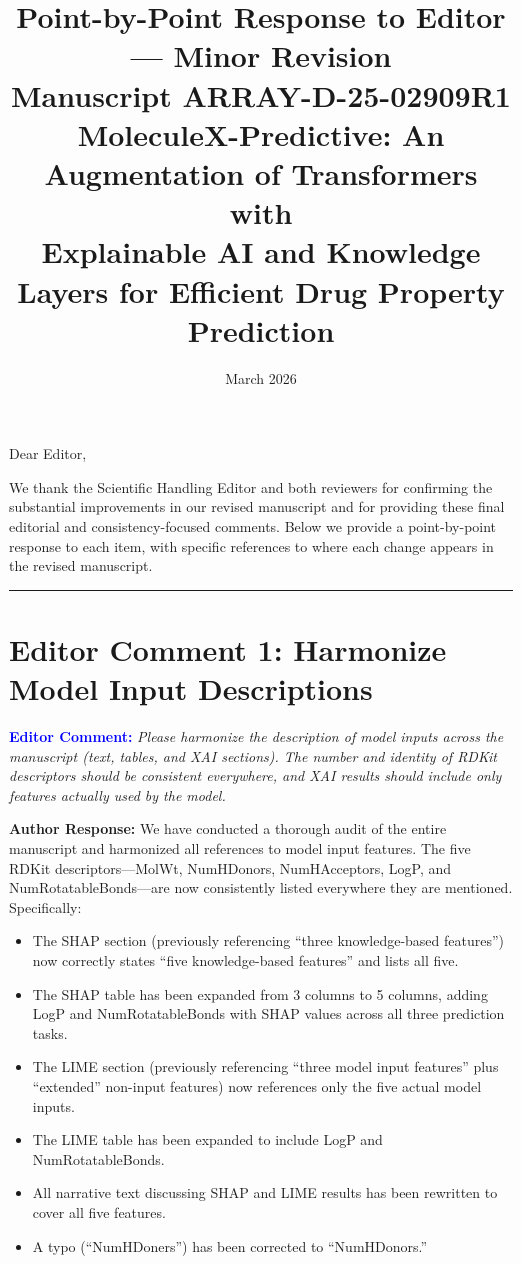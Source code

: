 \documentclass[12pt]{article}
\title{Point-by-Point Response to Editor --- Minor Revision\\[0.5em]
\large Manuscript ARRAY-D-25-02909R1\\
MoleculeX-Predictive: An Augmentation of Transformers with\\Explainable AI and Knowledge Layers for Efficient Drug Property Prediction}
\author{}
\date{March 2026}
\newcommand{\EC}[1]{\textbf{\textcolor{blue}{Editor Comment:}} \textit{#1}\vspace{0.3em}}
\newcommand{\AR}[1]{\textbf{Author Response:} #1\vspace{0.8em}}
\begin{document}
\maketitle

\noindent Dear Editor,

\medskip\noindent We thank the Scientific Handling Editor and both reviewers for confirming the substantial improvements in our revised manuscript and for providing these final editorial and consistency-focused comments. Below we provide a point-by-point response to each item, with specific references to where each change appears in the revised manuscript.

\bigskip
\hrule
\bigskip

\section*{Editor Comment 1: Harmonize Model Input Descriptions}

\EC{Please harmonize the description of model inputs across the manuscript (text, tables, and XAI sections). The number and identity of RDKit descriptors should be consistent everywhere, and XAI results should include only features actually used by the model.}

\AR{We have conducted a thorough audit of the entire manuscript and harmonized all references to model input features. The five RDKit descriptors---MolWt, NumHDonors, NumHAcceptors, LogP, and NumRotatableBonds---are now consistently listed everywhere they are mentioned. Specifically:
\begin{itemize}[nosep]
\item The SHAP section (previously referencing ``three knowledge-based features'') now correctly states ``five knowledge-based features'' and lists all five.
\item The SHAP table has been expanded from 3 columns to 5 columns, adding LogP and NumRotatableBonds with SHAP values across all three prediction tasks.
\item The LIME section (previously referencing ``three model input features'' plus ``extended'' non-input features) now references only the five actual model inputs.
\item The LIME table has been expanded to include LogP and NumRotatableBonds.
\item All narrative text discussing SHAP and LIME results has been rewritten to cover all five features.
\item A typo (``NumHDoners'') has been corrected to ``NumHDonors.''
\end{itemize}}
\end{document}
